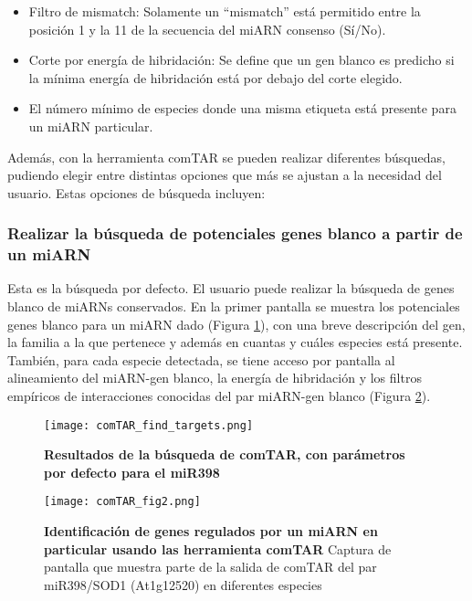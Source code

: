 \begin{itemize}
    \item Filtro de mismatch: Solamente un ``mismatch'' está permitido entre la posición 1 y la 11 de la secuencia del miARN consenso (Sí/No).
    \item Corte por energía de hibridación: Se define que un gen blanco es predicho si la mínima energía de hibridación está por debajo del corte elegido.
    \item El número mínimo de especies donde una misma etiqueta está presente para un miARN particular.
\end{itemize}

Además, con la herramienta comTAR se pueden realizar diferentes búsquedas, pudiendo elegir entre distintas opciones que más se ajustan a la necesidad del usuario.
Estas opciones de búsqueda incluyen:

\subsubsection{Realizar la búsqueda de potenciales genes blanco a partir de un miARN}
Esta es la búsqueda por defecto.
El usuario puede realizar la búsqueda de genes blanco de miARNs conservados.
En la primer pantalla se muestra los potenciales genes blanco para un miARN dado (Figura \ref{fig:comTAR_find_targets}), con una breve descripción del gen, la familia a la que pertenece y además en cuantas y cuáles especies está presente.
También, para cada especie detectada, se tiene acceso por pantalla al alineamiento del miARN-gen blanco, la energía de hibridación y los filtros empíricos de interacciones conocidas del par miARN-gen blanco (Figura \ref{fig:comTAR_fig2}).

\begin{figure}[htbp!] 
    \centering    
    \texttt{[image: comTAR\_find\_targets.png]}
    \caption[Resultados del comTAR para el miR398]{
    \textbf{Resultados de la búsqueda de comTAR, con parámetros por defecto para el miR398}}
    \label{fig:comTAR_find_targets}
\end{figure}

\begin{figure}[htbp!] 
    \centering    
    \texttt{[image: comTAR\_fig2.png]}
    \caption[Identificación de genes regulados por un miARN en particular usando las herramienta comTAR]{
    \textbf{Identificación de genes regulados por un miARN en particular usando las herramienta comTAR}
    Captura de pantalla que muestra parte de la salida de comTAR del par miR398/SOD1 (At1g12520) en diferentes especies}
    \label{fig:comTAR_fig2}
\end{figure}

